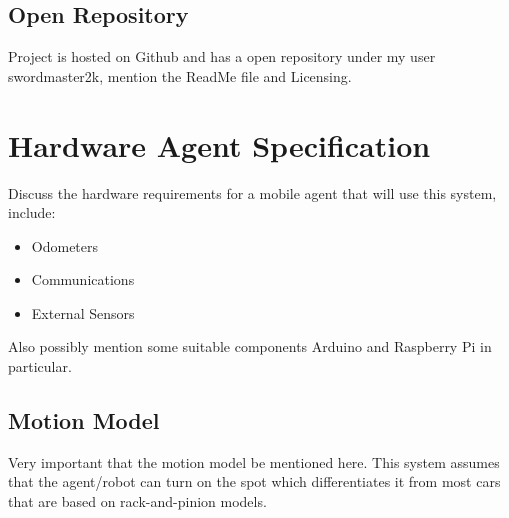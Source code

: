 \subsection{Open Repository}
Project is hosted on Github and has a open repository under my user swordmaster2k, mention the ReadMe file and Licensing.


\section{Hardware Agent Specification}
Discuss the hardware requirements for a mobile agent that will use this system, include:

\begin{itemize}
\item Odometers
\item Communications
\item External Sensors
\end{itemize}

Also possibly mention some suitable components Arduino and Raspberry Pi in particular. 

\subsection{Motion Model}
Very important that the motion model be mentioned here. This system assumes that the agent/robot can turn on the spot which differentiates it from most cars that are based on rack-and-pinion models.

\newpage

